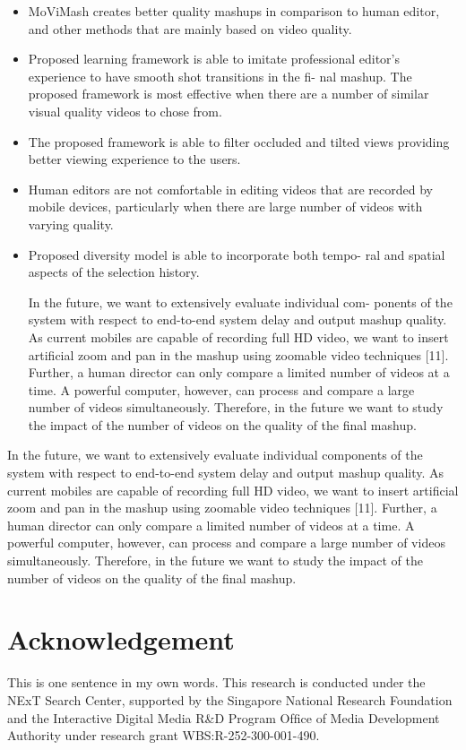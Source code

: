\documentclass{clsfile}
\begin{document}
\begin{itemize}
\item MoViMash creates better quality mashups in comparison to
human editor, and other methods that are mainly based on
video quality.

\item Proposed learning framework is able to imitate professional
editor’s experience to have smooth shot transitions in the fi-
nal mashup. The proposed framework is most effective when there are a number of similar visual quality videos to chose
from.

\item The proposed framework is able to filter occluded and tilted
views providing better viewing experience to the users.

\item Human editors are not comfortable in editing videos that are
recorded by mobile devices, particularly when there are large
number of videos with varying quality.
\item Proposed diversity model is able to incorporate both tempo-
ral and spatial aspects of the selection history.

In the future, we want to extensively evaluate individual com-
ponents of the system with respect to end-to-end system delay and
output mashup quality. As current mobiles are capable of recording full HD video, we want to insert artificial zoom and pan in the
mashup using zoomable video techniques [11]. Further, a human
director can only compare a limited number of videos at a time.
A powerful computer, however, can process and compare a large
number of videos simultaneously. Therefore, in the future we want
to study the impact of the number of videos on the quality of the
final mashup.
\end{itemize}

In the future, we want to extensively evaluate individual components of the system with respect to end-to-end system delay and output mashup quality. As current mobiles are capable of recording full HD video, we want to insert artiﬁcial zoom and pan in the mashup using zoomable video techniques [11]. Further, a human director can only compare a limited number of videos at a time. A powerful computer, however, can process and compare a large number of videos simultaneously. Therefore, in the future we want to study the impact of the number of videos on the quality of the ﬁnal mashup.

\section*{Acknowledgement}
This is one sentence in my own words.
This research is conducted under the NExT Search Center, supported by the Singapore National Research Foundation and the Interactive Digital Media R\&D Program Ofﬁce of Media Development Authority under research grant WBS:R-252-300-001-490.


\end{document}
